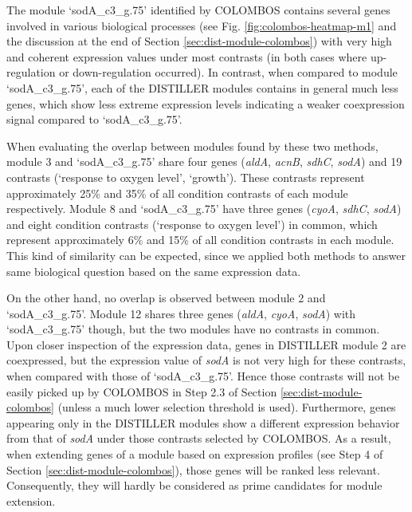 The module `sodA\_c3\_g.75' identified by COLOMBOS contains several genes
involved in various biological processes (see
Fig. \ref{fig:colombos-heatmap-m1} and the discussion at the end of Section
\ref{sec:dist-module-colombos}) with very high and coherent expression values
under most contrasts (in both cases where up-regulation or down-regulation
occurred). In contrast, when compared to module `sodA\_c3\_g.75', each of the
DISTILLER modules contains in general much less genes, which show less extreme
expression levels indicating a weaker coexpression signal compared to
`sodA\_c3\_g.75'.

When evaluating the overlap between modules found by these two methods, module
3 and `sodA\_c3\_g.75' share four genes (\textit{aldA}, \textit{acnB},
\textit{sdhC}, \textit{sodA}) and 19 contrasts (`response to oxygen level',
`growth').  These contrasts represent approximately 25\% and 35\% of all
condition contrasts of each module respectively. Module 8 and `sodA\_c3\_g.75'
have three genes (\textit{cyoA}, \textit{sdhC}, \textit{sodA}) and eight
condition contrasts (`response to oxygen level') in common, which represent
approximately 6\% and 15\% of all condition contrasts in each module.  This
kind of similarity can be expected, since we applied both methods to answer
same biological question based on the same expression data.

On the other hand, no overlap is observed between module 2 and
`sodA\_c3\_g.75'.  Module 12 shares three genes (\textit{aldA}, \textit{cyoA},
\textit{sodA}) with `sodA\_c3\_g.75' though, but the two modules have no
contrasts in common.  Upon closer inspection of the expression data, genes in
DISTILLER module 2 are coexpressed, but the expression value of \textit{sodA}
is not very high for these contrasts, when compared with those of
`sodA\_c3\_g.75'. Hence those contrasts will not be easily picked up by
COLOMBOS in Step 2.3 of Section \ref{sec:dist-module-colombos} (unless a much
lower selection threshold is used).  Furthermore, genes appearing only in the
DISTILLER modules show a different expression behavior from that of
\textit{sodA} under those contrasts selected by COLOMBOS.  As a result, when
extending genes of a module based on expression profiles (see Step 4 of Section
\ref{sec:dist-module-colombos}), those genes will be ranked less
relevant. Consequently, they will hardly be considered as prime candidates for
module extension.

